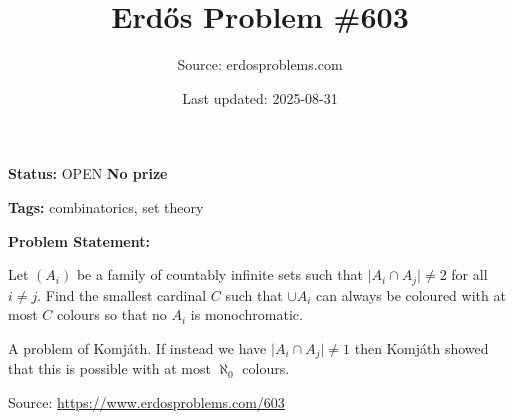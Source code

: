 \documentclass{article}
\title{Erd\H{o}s Problem \#603}
\date{Last updated: 2025-08-31}
\author{Source: erdosproblems.com}
\begin{document}
\maketitle

\noindent\textbf{Status:} OPEN \quad \textbf{No prize}

\noindent\textbf{Tags:} combinatorics, set theory

\medskip

\noindent\textbf{Problem Statement:}

Let $(A_i)$ be a family of countably infinite sets such that $\lvert A_i\cap A_j\rvert \neq 2$ for all $i\neq j$. Find the smallest cardinal $C$ such that $\cup A_i$ can always be coloured with at most $C$ colours so that no $A_i$ is monochromatic.




A problem of Komj\'{a}th. If instead we have $\lvert A_i\cap A_j\rvert \neq 1$ then Komj\'{a}th showed that this is possible with at most $\aleph_0$ colours.


\bigskip
\noindent\small{Source: \url{https://www.erdosproblems.com/603}}
\end{document}
